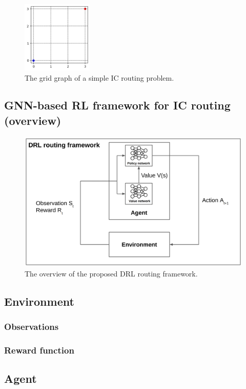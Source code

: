 \documentclass[letterpaper]{article}
\begin{document}
\begin{figure}[h!]
    \centering
    \includegraphics[width=0.3\textwidth]{figure/grid_grap.png}
    \caption{The grid graph of a simple IC routing problem.}
    \label{fig:grid}
\end{figure}

\subsection{GNN-based RL framework for IC routing (overview)}
\begin{figure}[h!]
    \centering
    \includegraphics[width=\textwidth]{figure/overview.png}
    \caption{The overview of the proposed DRL routing framework.}
    \label{fig:overview}
\end{figure}

\subsection{Environment}
\subsubsection{Observations}
\subsubsection{Reward function}
\subsection{Agent}
\end{document}

